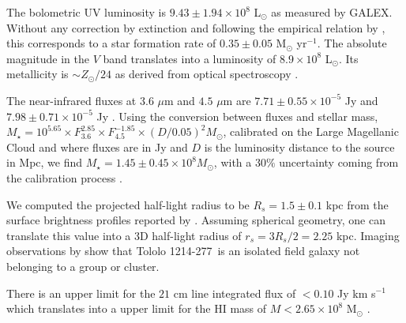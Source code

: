 \documentclass[a4,useAMS,usenatbib,usegraphicx]{mn2e}
\newcommand{\tol}{Tololo 1214-277}
\begin{document}
The bolometric UV luminosity is $9.43\pm1.94 \times 10^{8}$
L$_{\odot}$ as measured by GALEX. Without any correction by extinction
and following the empirical relation by \cite{Kennicutt98}, this
corresponds to a star formation rate of $0.35\pm 0.05$ M$_{\odot}$
yr$^{-1}$. 
The absolute magnitude in the $V$ band translates into a luminosity of
$8.9\times 10^{8}$ L$_{\odot}$.  
Its metallicity is $\sim Z_{\odot}/24$ as derived from
optical spectroscopy \citep{Izotov04}. 
%

The near-infrared fluxes at $3.6$ $\mu$m and $4.5$ $\mu$m are
$7.71\pm0.55\times 10^{-5}$ Jy and $7.98\pm0.71\times 10^{-5}$ Jy
\citep{2008ApJ...678..804E}.
Using the conversion between fluxes and
stellar mass, $M_{\star} =
10^{5.65} \times F_{3.6}^{2.85} \times F_{4.5}^{-1.85} \times
(D/0.05)^2 M_{\odot}$,  calibrated on the Large Magellanic Cloud 
and  where fluxes are in Jy and $D$ is the luminosity
distance to the source in Mpc, we find $M_{\star} = 1.45\pm0.45\times 10^{8}
M_{\odot}$, with a $30\%$ uncertainty coming from the calibration
process \citep{2012AJ....143..139E}.  

We computed the projected half-light radius to be $R_s=1.5\pm0.1$ kpc 
from the surface brightness profiles reported by \cite{2003A&A...410..481N}. 
Assuming spherical geometry, one can translate this value into a 3D
half-light radius of $r_s=3R_s/2=2.25$ kpc.
Imaging observations by \cite{2001AJ....121..169F} show that \tol\ is
an isolated field galaxy not belonging to a group or cluster. 

There is an upper limit for the  $21$ cm line integrated flux of $<0.10$
Jy km s$^{-1}$  which translates into a upper limit for the HI mass of
$M<2.65\times 10^{8}$ M$_{\odot}$ \citep{pustilnikmartin07}.
\end{document}
